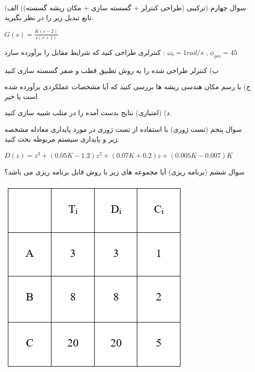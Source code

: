 \documentclass[12pt]{article}
\begin{document}
    \begin{problem}{سوال چهارم}
    	(ترکیبی (طراحی کنترلر + گسسته سازی + مکان ریشه گسسته)) الف) تابع تبدیل زیر را در نظر بگیرید. 
    	
    	\centering
    	$G(s) = \frac{K(s-2)}{s(s+1)}$
    	
    	\raggedright
    	کنترلری طراحی کنید که شرایط مقابل را برآورده سازد : 
    	$\omega_b = 1 rad/s$
    	,
    	$\phi_{pm} = 45$
    	
    	ب) کنترلر طراحی شده را به روش تطبیق قطب و صفر گسسته سازی کنید
    	
    	ج) با رسم مکان هندسی ریشه ها بررسی کنید که آیا مشخصات عملکردی برآورده شده است یا خیر.
    	
    	د) (امتیازی) نتایح بدست آمده را در متلب شبیه سازی کنید.
    \end{problem}
    
    \begin{problem}{سوال پنجم}
    	(تست ژوری) با استفاده از تست ژوری در مورد پایداری معادله مشخصه زیر و پایداری سیستم مربوطه بحث کنید.
    	
    	\centering
    	$D(z) = z^3 + (0.05K-1.2)z^2 + (0.07K + 0.2)z + (0.005K - 0.007)K$
    \end{problem}
    
    \begin{problem}{سوال ششم}
    	(برنامه ریزی) آیا مجموعه  های زیر با روش 
    	قابل برنامه ریزی می باشد؟
    	
    	\centering
    	\includegraphics[scale=1]{Resources/2.png}
    \end{problem}
\end{document}
